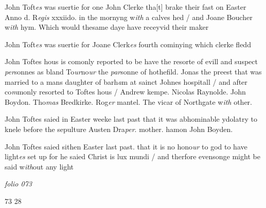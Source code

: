 \documentclass[12pt, a4paper]{book}
\begin{document}
		\ifthenelse{\isodd{\thepage}}
		{\reversemarginpar}
		{\normalmarginpar}
		John Toft\textit{es} was suertie for one John Clerke tha[t]
 brake their fast on Easter Anno d. R\textit{egis} xxxiido.
		in the mornyng w\textit{ith} a calves hed / and Joane
 Boucher w\textit{ith} hym. Which would thesame daye have
	receyvid their maker
	
		\ifthenelse{\isodd{\thepage}}
		{\reversemarginpar}
		{\normalmarginpar}
		John Toft\textit{es} was suertie for Joane Clerk\textit{es} fourth
 cominying which clerke fledd
	
		\ifthenelse{\isodd{\thepage}}
		{\reversemarginpar}
		{\normalmarginpar}
		John Toftes hous is comonly reported to be have
		the resorte of evill and suspect \textit{per}sonnes as bland
		To\textit{ur}no\textit{ur} the \textit{par}sonne of hothefild. Jonas the preest
		that was married to a mans daughter of barh\textit{a}m
 at sainct Johnes hospitall / and after co\textit{m}monly
		resorted to Toftes hous / Andrew kempe. Nicolas
			Raynolde. John Boydon. Tho\textit{mas} Bredkirke. Rog\textit{er} mantel. The
 vicar of Northgate w\textit{ith} other.
	 
			 
		\ifthenelse{\isodd{\thepage}}
		{\reversemarginpar}
		{\normalmarginpar}
		John Toftes saied in Easter weeke last past
 that it was abhominable ydolatry to knele
		before the sepulture Austen Dra\textit{per}. mother. hamon
		John Boyden.
	
			
		\ifthenelse{\isodd{\thepage}}
		{\reversemarginpar}
		{\normalmarginpar}
		John Toftes saied sithen Easter last past. that
 it is no hono\textit{ur} to god to have light\textit{es} set up
 for he saied Christ is lux mundi / and therfore
 evensonge might be said w\textit{ith}out any light



\dotfill
						\newpage
{}

\textit{folio 073}


\begin{flushright}{\color{Mahogany}73} 28\end{flushright}
	
\end{document}
